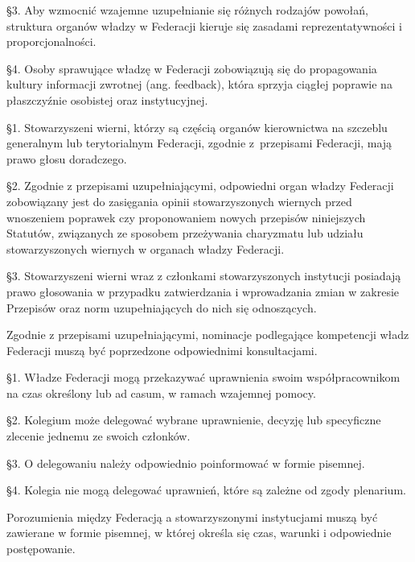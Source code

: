 \S{}3. Aby wzmocnić wzajemne uzupełnianie się różnych rodzajów powołań, struktura organów władzy w Federacji kieruje się zasadami reprezentatywności i proporcjonalności.


\S{}4. Osoby sprawujące władzę w Federacji zobowiązują się do propagowania kultury informacji zwrotnej (ang. feedback), która sprzyja ciągłej poprawie na płaszczyźnie osobistej oraz instytucyjnej.
 




 \S{}1. Stowarzyszeni wierni, którzy są częścią organów kierownictwa na szczeblu generalnym lub terytorialnym Federacji, zgodnie \mbox{z przepisami} Federacji, mają prawo głosu doradczego.


\S{}2. Zgodnie z przepisami uzupełniającymi, odpowiedni organ władzy Federacji zobowiązany jest do zasięgania opinii stowarzyszonych wiernych przed wnoszeniem poprawek czy proponowaniem nowych przepisów niniejszych Statutów, związanych ze sposobem przeżywania charyzmatu lub udziału stowarzyszonych wiernych w organach władzy Federacji.


\S{}3. Stowarzyszeni wierni wraz z członkami stowarzyszonych instytucji posiadają prawo głosowania w przypadku zatwierdzania i wprowadzania zmian w zakresie Przepisów oraz norm uzupełniających do nich się odnoszących.
 


 Zgodnie z przepisami uzupełniającymi, nominacje podlegające kompetencji władz Federacji muszą być poprzedzone odpowiednimi konsultacjami.
 


 \S{}1. Władze Federacji mogą przekazywać uprawnienia swoim współpracownikom na czas określony lub ad casum, w ramach wzajemnej pomocy.


\S{}2. Kolegium może delegować wybrane uprawnienie, decyzję lub specyficzne zlecenie jednemu ze swoich członków.


\S{}3. O delegowaniu należy odpowiednio poinformować w formie pisemnej.


\S{}4. Kolegia nie mogą delegować uprawnień, które są zależne od zgody plenarium.
 


 Porozumienia między Federacją a stowarzyszonymi instytucjami muszą być zawierane w formie pisemnej, w której określa się czas, warunki i odpowiednie postępowanie.
 
